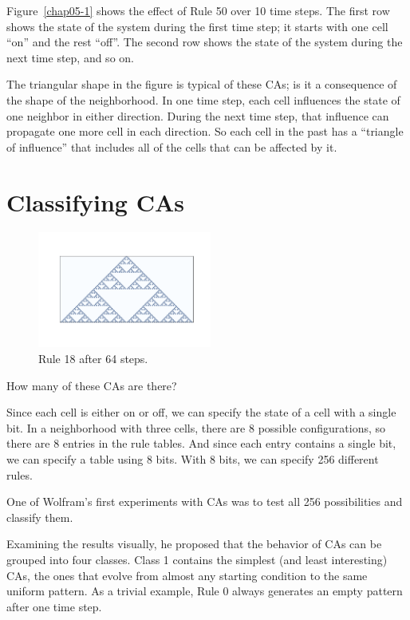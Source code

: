\documentclass[12pt]{book}
\theoremstyle{exercise}
\begin{document}
Figure~\ref{chap05-1} shows the effect of Rule 50 over 10
time steps.  The first row shows the state of the system during the first
time step; it starts with one cell ``on'' and the rest ``off''.
The second row shows the state of the system during the
next time step, and so on.

The triangular shape in the figure is typical of these CAs; is it a
consequence of the shape of the neighborhood.  In one time step, each
cell influences the state of one neighbor in either direction.  During
the next time step, that influence can propagate one more cell in each
direction.  So each cell in the past has a ``triangle of influence''
that includes all of the cells that can be affected by it.



\section{Classifying CAs}

\begin{figure}
\centerline{\includegraphics[height=1.5in]{figs/chap05-3.pdf}}
\caption{Rule 18 after 64 steps.}
\label{chap05-3}
\end{figure}

How many of these CAs are there?

Since each cell is either on or off, we can specify the state
of a cell with a single bit.  In a neighborhood with three cells,
there are 8 possible configurations, so there are 8 entries
in the rule tables.  And since each entry contains a single bit,
we can specify a table using 8 bits.  With 8 bits, we can
specify 256 different rules.

One of Wolfram's first experiments with CAs was to test all 256
possibilities and classify them.

Examining the results visually, he proposed that the behavior of CAs
can be grouped into four classes.  Class 1 contains the simplest (and
least interesting) CAs, the ones that evolve from almost any starting
condition to the same uniform pattern.  As a trivial example, Rule 0
always generates an empty pattern after one time step.
\end{document}
